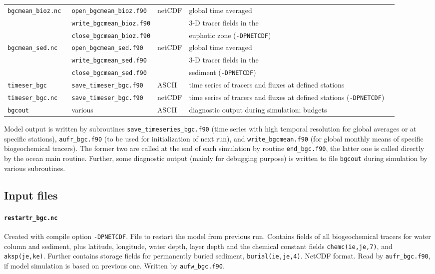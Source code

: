\documentclass[11pt,a4paper,fleqn,twoside]{article}
\begin{document}
\begin{table}[hbt]
\begin{center}
\begin{tabular}{lllp{4.5cm}l}
{\tt bgcmean\_bioz.nc }& {\tt open\_bgcmean\_bioz.f90}    & netCDF & global time averaged \\
                       & {\tt write\_bgcmean\_bioz.f90}   &        & 3-D tracer fields in the\\
                       & {\tt close\_bgcmean\_bioz.f90}   &        & euphotic zone ({\tt -DPNETCDF})  \\

{\tt bgcmean\_sed.nc }& {\tt open\_bgcmean\_sed.f90}    & netCDF & global time averaged \\
                      & {\tt write\_bgcmean\_sed.f90}   &        & 3-D tracer fields in the\\
                      & {\tt close\_bgcmean\_sed.f90}   &        & sediment ({\tt -DPNETCDF})  \\

{\tt timeser\_bgc}& {\tt save\_timeser\_bgc.f90} & ASCII & time series of tracers and fluxes at defined stations\\
{\tt timeser\_bgc.nc}& {\tt save\_timeser\_bgc.f90} & netCDF & time series of tracers and fluxes at defined stations ({\tt -DPNETCDF})\\
{\tt bgcout}& various & ASCII & diagnostic output during simulation; budgets\\
\hline
\end{tabular}
\end{center}
\end{table}

Model output is written by subroutines {\tt save\_timeseries\_bgc.f90} 
(time series with high temporal resolution for global averages or at specific
stations), {\tt aufr\_bgc.f90} (to be used for initialization of next run), and
{\tt write\_bgcmean.f90} (for global monthly means of specific biogeochemical
tracers). The former two are called at the end of each simulation by routine
{\tt end\_bgc.f90}, the latter one is called directly by the ocean main
routine. Further, some diagnostic output (mainly for debugging purpose) is
written to file {\tt bgcout} during simulation by various subroutines. 



\subsection{\label{input_files}Input files} 

\paragraph{\tt restartr\_bgc.nc} Created with compile option {\tt -DPNETCDF}.
File to restart the model from previous run. Contains fields of all
biogeochemical tracers for water column and sediment, plus latitude, longitude,
water depth, layer depth and the chemical constant fields {\tt chemc(ie,je,7)},
and {\tt aksp(je,ke)}. Further contains storage fields for permanently buried
sediment, {\tt burial(ie,je,4)}. NetCDF format. Read by {\tt aufr\_bgc.f90}, if
model simulation is based on previous one. Written by {\tt aufw\_bgc.f90}.
\end{document}
